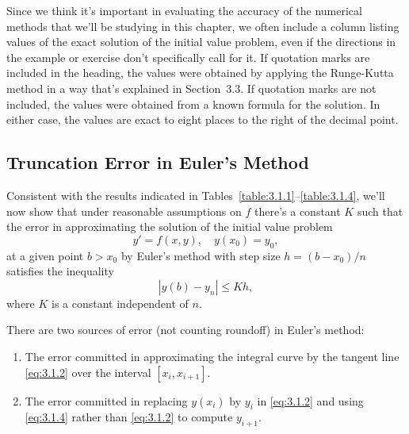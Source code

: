 \documentclass{ximera}
\begin{document}
\begin{example}
\end{example}


Since we think it's important in evaluating the accuracy of the
numerical methods that we'll be studying in this chapter, we
often include a column listing values of the exact solution of the
initial value problem, even if the directions in the example or
exercise don't specifically call for it. If  quotation marks are
included in the heading, the values were obtained by applying the
Runge-Kutta method in a way that's explained in Section~3.3.
If  quotation marks are not included,  the values were
obtained from a known formula for the solution.
In either case, the values are exact to eight places to the
right of the decimal point.

\subsection*{Truncation Error in Euler's Method}

Consistent with the results indicated in
Tables~\ref{table:3.1.1}--\ref{table:3.1.4}, we'll now show that under
reasonable assumptions on $f$ there's a constant $K$ such that
the error in approximating the solution of the initial value problem
$$
y'=f(x,y),\quad y(x_0)=y_0,
$$
at a given point $b>x_0$ by Euler's method with step size
$h=(b-x_0)/n$ satisfies the inequality
$$
|y(b)-y_n|\leq Kh,
$$
where $K$ is a constant independent of $n$.


There are two sources of error (not counting roundoff) in Euler's
method:
\begin{enumerate}
\item\label{item:3.1.1a} %
The error committed in approximating the integral curve by the tangent
line \eqref{eq:3.1.2} over the interval $[x_i,x_{i+1}]$.
\item\label{item:3.1.1b} %
The error committed in replacing $y(x_i)$ by $y_i$ in
\eqref{eq:3.1.2} and using \eqref{eq:3.1.4} rather than \eqref{eq:3.1.2} to
compute $y_{i+1}$.
 \end{enumerate}
\end{document}
